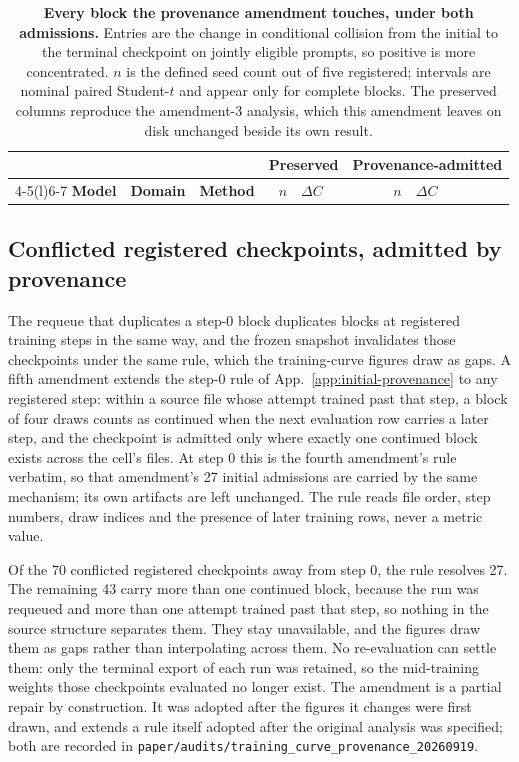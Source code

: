 \documentclass{article}
\newcommand{\1}{\mathbf 1}
\theoremstyle{remark}
\theoremstyle{definition}
\theoremstyle{plain}
\begin{document}
\begin{table}[!htbp]
  \centering
  \caption{\textbf{Every block the provenance amendment touches, under both
  admissions.} Entries are the change in conditional collision from the initial
  to the terminal checkpoint on jointly eligible prompts, so positive is more
  concentrated. $n$ is the defined seed count out of five registered; intervals
  are nominal paired Student-$t$ and appear only for complete blocks. The
  preserved columns reproduce the amendment-3 analysis, which this amendment
  leaves on disk unchanged beside its own result.}
  \label{tab:initial-provenance}
  \small
  \setlength{\tabcolsep}{4pt}
  \begin{tabular}{@{}lll rl rl@{}}
    \toprule
    & & & \multicolumn{2}{c}{\textbf{Preserved}} & \multicolumn{2}{c}{\textbf{Provenance-admitted}} \\
    \cmidrule(lr){4-5}\cmidrule(l){6-7}
    \textbf{Model} & \textbf{Domain} & \textbf{Method} &
      $n$ & $\Delta C$ & $n$ & $\Delta C$ \\
    \midrule
    
  \end{tabular}
\end{table}

\subsection{Conflicted registered checkpoints, admitted by provenance}
\label{app:registered-provenance}

The requeue that duplicates a step-0 block duplicates blocks at registered
training steps in the same way, and the frozen snapshot invalidates those
checkpoints under the same rule, which the training-curve figures draw as gaps.
A fifth amendment extends the step-0 rule of App.~\ref{app:initial-provenance}
to any registered step: within a source file whose attempt trained past that
step, a block of four draws counts as continued when the next evaluation row
carries a later step, and the checkpoint is admitted only where exactly one
continued block exists across the cell's files. At step 0 this is the fourth
amendment's rule verbatim, so that amendment's 27 initial admissions are
carried by the same mechanism; its own artifacts are left unchanged. The rule
reads file order, step numbers, draw indices and the presence of later training
rows, never a metric value.

Of the 70 conflicted registered checkpoints away from step 0, the rule resolves
27. The remaining 43 carry more than one continued block, because the run was
requeued and more than one attempt trained past that step, so nothing in the
source structure separates them. They stay unavailable, and the figures draw
them as gaps rather than interpolating across them. No re-evaluation can settle
them: only the terminal export of each run was retained, so the mid-training
weights those checkpoints evaluated no longer exist. The amendment is a partial
repair by construction. It was adopted after the figures it changes were first
drawn, and extends a rule itself adopted after the original analysis was
specified; both are recorded in
\texttt{paper/audits/training\_curve\_provenance\_20260919}.
\end{document}
